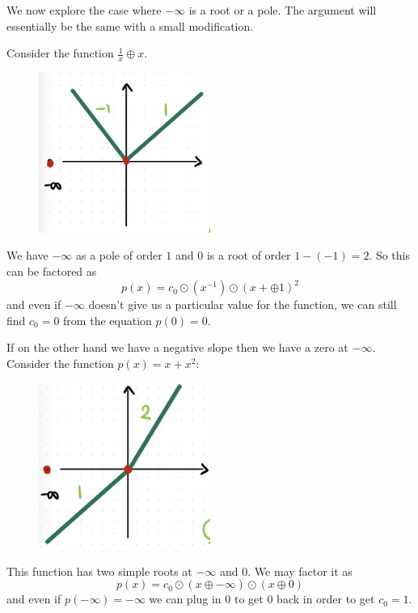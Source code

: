 \documentclass[12pt]{memoir}
\theoremstyle{definition}
\begin{document}
\begin{Ex}
    We now explore the case where $-\infty$ is a root or a pole. The argument will essentially be the same with a small modification.\par 
    Consider the function $\frac{1}{x}\oplus x$.
    \begin{figure}[h!]
        \centering
        \includegraphics[width=0.5\textwidth]{figs/fig4-2RootAndPoleProof.png}
        \label{fig:4.2-RootAndPoleProof}
    \end{figure}
    We have $-\infty$ as a pole of order $1$ and $0$ is a root of order $1-(-1)=2$. So this can be factored as 
    $$p(x)=c_0\odot(x^{-1})\odot(x+\oplus 1)^2$$
    and even if $-\infty$ doesn't give us a particular value for the function, we can still find $c_0=0$ from the equation $p(0)=0$.\par 
    If on the other hand we have a negative slope then we have a zero at $-\infty$. Consider the function $p(x)=x+x^2$:
    \begin{figure}[h!]
        \centering
        \includegraphics[width=0.5\textwidth]{figs/fig4-3RootsForProof.png}
        \label{fig:4.3-RootsForProof}
    \end{figure}
    This function has two simple roots at $-\infty$ and $0$. We may factor it as 
    $$p(x)=c_0\odot(x\oplus-\infty)\odot(x\oplus 0)$$
    and even if $p(-\infty)=-\infty$ we can plug in $0$ to get $0$ back in order to get $c_0=1$.
\end{Ex}
\end{document}
